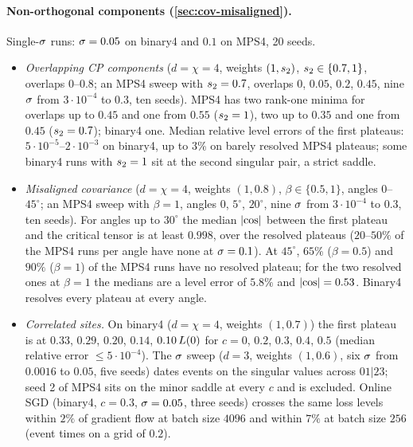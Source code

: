 \paragraph{Non-orthogonal components (\cref{sec:cov-misaligned}).}
\empirical{} Single-$\sigma$ runs: $\sigma=0.05$ on binary4 and $0.1$ on MPS4, 20 seeds.
\begin{itemize}
  \item \emph{Overlapping CP components} ($d=\chi=4$, weights $(1,s_{2})$, $s_{2}\in\{0.7,1\}$, overlaps $0$--$0.8$; an MPS4
    sweep with $s_{2}=0.7$, overlaps $0$, $0.05$, $0.2$, $0.45$, nine $\sigma$ from $3\cdot10^{-4}$ to $0.3$, ten seeds).
    MPS4 has two rank-one minima for overlaps up to $0.45$ and one from $0.55$ ($s_{2}=1$), two up to $0.35$ and one
    from $0.45$ ($s_{2}=0.7$); binary4 one. Median relative level errors of the first plateaus: $5\cdot10^{-5}$--$2\cdot10^{-3}$
    on binary4, up to $3\%$ on barely resolved MPS4 plateaus; some binary4 runs with $s_{2}=1$ sit at the second
    singular pair, a strict saddle.
  \item \emph{Misaligned covariance} ($d=\chi=4$, weights $(1,0.8)$, $\beta\in\{0.5,1\}$, angles $0$--$45^\circ$; an MPS4 sweep
    with $\beta=1$, angles $0$, $5^\circ$, $20^\circ$, nine $\sigma$ from $3\cdot10^{-4}$ to $0.3$, ten seeds). For angles up to $30^\circ$
    the median $\lvert\cos\rvert$ between the first plateau and the critical tensor is at least $0.998$, over the resolved
    plateaus ($20$--$50\%$ of the MPS4 runs per angle have none at $\sigma=0.1$). At $45^\circ$, $65\%$ ($\beta=0.5$) and
    $90\%$ ($\beta=1$) of the MPS4 runs have no resolved plateau; for the two resolved ones at $\beta=1$ the medians
    are a level error of $5.8\%$ and $\lvert\cos\rvert=0.53$. Binary4 resolves every plateau at every angle.
  \item \emph{Correlated sites.} On binary4 ($d=\chi=4$, weights $(1,0.7)$) the first plateau is at $0.33$, $0.29$,
    $0.20$, $0.14$, $0.10\,L(0)$ for $c=0$, $0.2$, $0.3$, $0.4$, $0.5$ (median relative error $\le5\cdot10^{-4}$). The
    $\sigma$ sweep ($d=3$, weights $(1,0.6)$, six $\sigma$ from $0.0016$ to $0.05$, five seeds) dates events on the
    singular values across $01|23$; seed 2 of MPS4 sits on the minor saddle at every $c$ and is excluded.
    Online SGD (binary4, $c=0.3$, $\sigma=0.05$, three seeds) crosses the same loss levels within $2\%$ of gradient
    flow at batch size $4096$ and within $7\%$ at batch size $256$ (event times on a grid of $0.2$).
\end{itemize}

